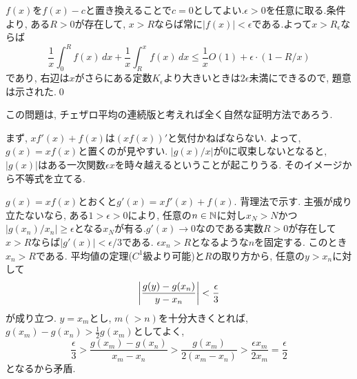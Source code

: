 \begin{egans}
$f(x)$を$f(x)-c$と置き換えることで$c=0$としてよい.$\epsilon > 0$を任意に取る.条件より, ある$R>0$が存在して, $x > R$ならば常に$|f(x)| < \epsilon$である.よって$x>R_{\epsilon}$ならば
\[\dfrac{1}{x} \int_{0}^{R}f(x)\,dx + \dfrac{1}{x}\int_{R}^{x} f(x)\, dx \leq \dfrac{1}{x}O(1) + \epsilon\cdot (1- R/x)\]
であり, 右辺は$x$がさらにある定数$K_{\epsilon}$より大きいときは$2\epsilon$未満にできるので, 題意は示された.\qed
\end{egans}
\begin{rem}
この問題は, チェザロ平均の連続版と考えれば全く自然な証明方法であろう.
\end{rem}

\begin{point}
まず, $xf'(x) + f(x)$は$(xf(x))'$と気付かねばならない. よって, $g(x)=xf(x)$と置くのが見やすい. $|g(x)/x|$が0に収束しないとなると, $|g(x)|$はある一次関数$\epsilon x$を時々越えるということが起こりうる. そのイメージから不等式を立てる.
\end{point}
\begin{egans}
$g(x) = xf(x)$とおくと$g'(x) = xf'(x) + f(x)$. 背理法で示す. 主張が成り立たないなら, ある$1>\epsilon > 0$により, 任意の$n\in\mathbb{N}$に対し$x_N > N$かつ$|g(x_n)/x_n| \geq \epsilon$となる$x_N$が有る.$g'(x)\to 0$なのである実数$R>0$が存在して$x>R$ならば$|g'(x)|<\epsilon/3$である. $\epsilon x_n > R$となるような$n$を固定する. このとき$x_n>R$である. 平均値の定理($C^1$級より可能)と$R$の取り方から, 任意の$y > x_n$に対して
\[\left| \dfrac{g(y) - g(x_n)}{y-x_n} \right| < \dfrac{\epsilon}{3}\]
が成り立つ. $y=x_m$とし, $m(>n)$を十分大きくとれば, $g(x_m) - g(x_n) > \frac{1}{2}g(x_m)$としてよく,
\[\dfrac{\epsilon}{3} > \dfrac{g(x_m) - g(x_n)}{x_m - x_n} > \dfrac{g(x_m)}{2(x_m-x_n)} > \dfrac{\epsilon x_m}{2x_m} = \dfrac{\epsilon}{2}\]
となるから矛盾.
\end{egans}

\lefba{
\begin{egprob} (H26基礎科目II)
$f:[0,\infty) \to \mb{R}$は連続で$\lim_{x\to \infty} f(x) = 1$とする. このとき,
\[\lim_{n\to \infty} \dfrac{1}{n!} \int_{0}^{\infty} f(x)e^{-x}x^n\, dx = 1\]
であることを証明せよ.
\end{egprob}
}

